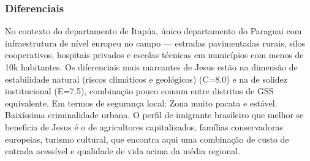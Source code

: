 \subsubsection*{Diferenciais}\label{dif-jesus-0715}
No contexto do departamento de Itapúa, único departamento do Paraguai com infraestrutura de nível europeu no campo — estradas pavimentadas rurais, silos cooperativos, hospitais privados e escolas técnicas em municípios com menos de 10k habitantes. Os diferenciais mais marcantes de Jesus estão na dimensão de estabilidade natural (riscos climáticos e geológicos) (C=8.0) e na de solidez institucional (E=7.5), combinação pouco comum entre distritos de GSS equivalente. Em termos de segurança local: Zona muito pacata e estável. Baixíssima criminalidade urbana. O perfil de imigrante brasileiro que melhor se beneficia de Jesus é o de agricultores capitalizados, famílias conservadoras europeias, turismo cultural, que encontra aqui uma combinação de custo de entrada acessível e qualidade de vida acima da média regional.
